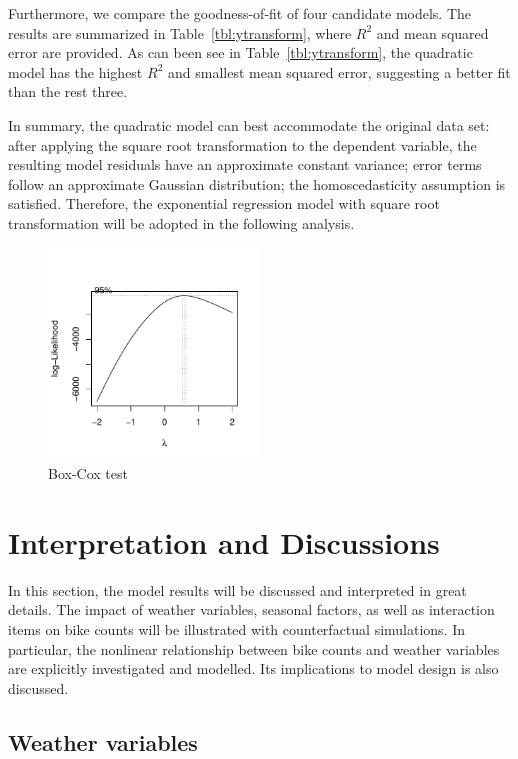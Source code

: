 \documentclass [11pt, proquest] {uwthesis}[2015/03/03]
\begin{document}
Furthermore, we compare the goodness-of-fit of four candidate models. The results are summarized in Table~\ref{tbl:ytransform}, where $R^2$ and mean squared error are provided. As can been see in Table~\ref{tbl:ytransform}, the quadratic model has the highest $R^2$ and smallest mean squared error, suggesting a better fit than the rest three.

In summary, the quadratic model can best accommodate the original data set: after applying the square root transformation to the dependent variable, the resulting model residuals have an approximate constant variance; error terms follow an approximate Gaussian distribution; the homoscedasticity assumption is satisfied. Therefore, the exponential regression model with square root transformation will be adopted in the following analysis. 

\begin{figure}
\centering
   \includegraphics[width=0.5\textwidth]{figures/boxcox} 
  \caption{Box-Cox test }
  \label{fig:boxcox}
\end{figure}

\section{Interpretation and Discussions}

In this section, the model results will be discussed and interpreted in great details. The impact of weather variables, seasonal factors, as well as interaction items on bike counts will be illustrated with counterfactual simulations. In particular, the nonlinear relationship between bike counts and weather variables are explicitly investigated and modelled. Its implications to model design is also discussed. 

\subsection{Weather variables}
\end{document}
